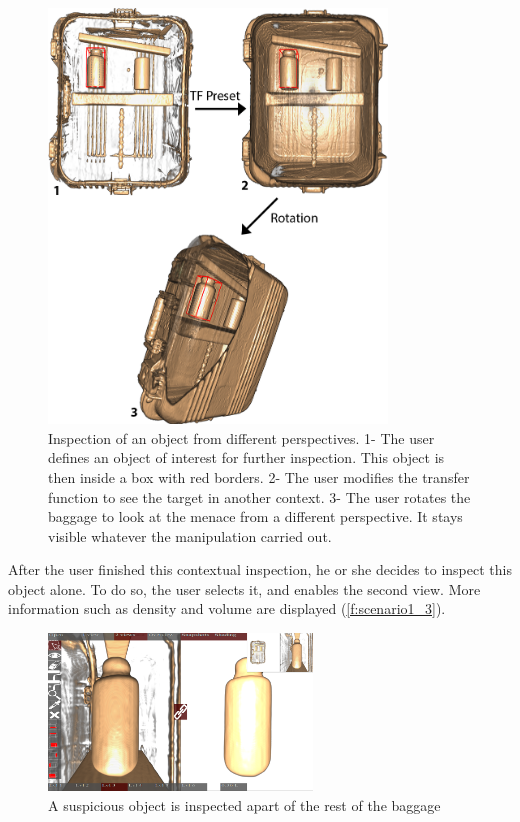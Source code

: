 \begin{figure}
\centering   
\includegraphics[width=9cm]{Figures/menace.png}
\caption[Inspection of an object from different perspectives.]{ Inspection of an object from different perspectives. 1- The user defines an object of interest for further inspection. This object is then inside a box with red borders. 2-  The user modifies the transfer function to see the target in another context. 3- The user rotates the baggage to look at the menace from a different perspective. It stays visible whatever the manipulation carried out.  }
\label{f:menace}
\end{figure} 


After the user finished this contextual inspection, he or she decides to inspect this object alone. To do so, the user selects it, and enables the second view. More information such as density and volume are displayed (\autoref{f:scenario1_3}).
\begin{figure}
\centering
\includegraphics[width=7cm]{Figures/scenario1_3.PNG}
\caption{ A suspicious object is inspected apart of the rest of the baggage }
\label{f:scenario1_3}
\end{figure}

